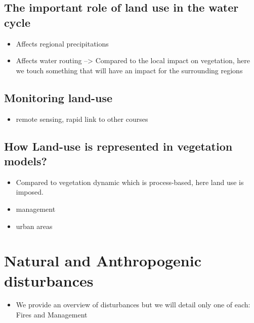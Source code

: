 \documentclass[
  oneside]{book}
\providecommand{\tightlist}{%
  \setlength{\itemsep}{0pt}\setlength{\parskip}{0pt}}
\begin{document}
\hypertarget{the-important-role-of-land-use-in-the-water-cycle}{%
\subsection{The important role of land use in the water cycle}\label{the-important-role-of-land-use-in-the-water-cycle}}

\begin{itemize}
\tightlist
\item
  Affects regional precipitations
\item
  Affects water routing
  --\textgreater{} Compared to the local impact on vegetation, here we touch something that will have an impact for the surrounding regions
\end{itemize}

\hypertarget{monitoring-land-use}{%
\subsection{Monitoring land-use}\label{monitoring-land-use}}

\begin{itemize}
\tightlist
\item
  remote sensing, rapid link to other courses
\end{itemize}

\hypertarget{how-land-use-is-represented-in-vegetation-models}{%
\subsection{How Land-use is represented in vegetation models?}\label{how-land-use-is-represented-in-vegetation-models}}

\begin{itemize}
\tightlist
\item
  Compared to vegetation dynamic which is process-based, here land use is imposed.
\item
  management
\item
  urban areas
\end{itemize}

\hypertarget{natural-and-anthropogenic-disturbances}{%
\section{Natural and Anthropogenic disturbances}\label{natural-and-anthropogenic-disturbances}}

\begin{itemize}
\tightlist
\item
  We provide an overview of disturbances but we will detail only one of each: Fires and Management
\end{itemize}
\end{document}
